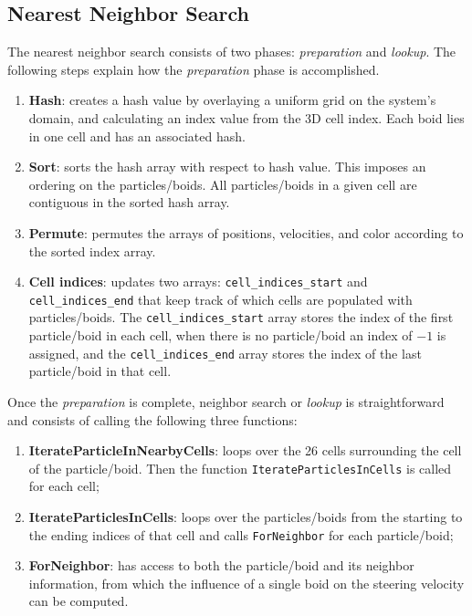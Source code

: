 \subsection{Nearest Neighbor Search}
The nearest neighbor search consists of two phases: \textit{preparation} and \textit{lookup}. The following steps explain how the \textit{preparation} phase is accomplished.

\begin{enumerate}
\item{\textbf{Hash}: creates a hash value by overlaying a uniform grid on the system's domain, and calculating an index value from the 3D cell index. Each boid lies in one cell and has an associated hash.}
\item{\textbf{Sort}: sorts the hash array with respect to hash value. This imposes an ordering on the particles/boids. All particles/boids in a given cell are contiguous in the sorted hash array.}
\item{\textbf{Permute}:  permutes the arrays of positions, velocities, and color according to the sorted index array.}
\item{\textbf{Cell indices}: updates two arrays: \texttt{cell\_indices\_start} and \texttt{cell\_indices\_end} that keep track of which cells are populated with particles/boids. The \texttt{cell\_indices\_start} array stores the index of the first particle/boid in each cell, when there is no particle/boid an index of $-1$ is assigned, and the \texttt{cell\_indices\_end} array stores the index of the last particle/boid in that cell.}
\end{enumerate}

Once the \textit{preparation} is complete, neighbor search or \textit{lookup} is straightforward and consists of calling the following three functions:  

\begin{enumerate}
\item{\textbf{IterateParticleInNearbyCells}: loops over the 26 cells surrounding the cell of the particle/boid. Then the function \texttt{IterateParticlesInCells} is called for each cell;}
\item{\textbf{IterateParticlesInCells}: loops over the particles/boids from the starting to the ending indices of that cell and calls \texttt{ForNeighbor} for each particle/boid};
\item{\textbf{ForNeighbor}: has access to both the particle/boid and its neighbor information, from which the influence of a single boid on the steering velocity can be computed.}
\end{enumerate}

